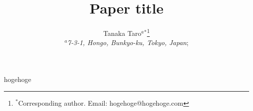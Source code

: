 \documentclass{tADR2e}
\begin{document}
   

\title{Paper title}

\author{Tanaka Taro$^{a}$$^{\ast}$\thanks{$^\ast$Corresponding author. Email: hogehoge@hogehoge.com \vspace{6pt}}\\\vspace{6pt}  $^{a}${\em{7-3-1, Hongo, Bunkyo-ku, Tokyo, Japan}};
\\\vspace{6pt} }

\maketitle

\begin{abstract}

\end{abstract}

\begin{keywords}
hogehoge
\end{keywords}













\end{document}

